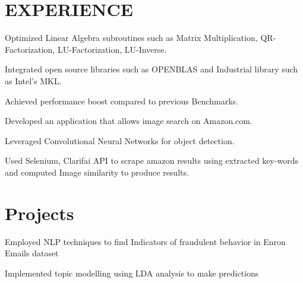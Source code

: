 \documentclass[]{deedy-resume-openfont}
\begin{document}
\begin{minipage}[t]{0.66\textwidth} 


\section{EXPERIENCE}

\vspace{\topsep} %
\begin{tightemize}\item Optimized Linear Algebra subroutines such as Matrix Multiplication, QR-Factorization,
LU-Factorization, LU-Inverse.
\item  Integrated open source libraries such as OPENBLAS and Industrial library such as Intel’s MKL.
\item  Achieved  performance boost compared to previous Benchmarks. 
\end{tightemize}
\sectionsep

\vspace{\topsep} %
\begin{tightemize}\item Developed an application that allows image search on Amazon.com.
\item Leveraged Convolutional Neural Networks for object detection.
\item  Used Selenium, Clarifai API to scrape amazon results using extracted key-words and computed Image similarity to produce results.
\end{tightemize}
\sectionsep


\section{Projects}


\begin{tightemize}
\item Employed NLP techniques to find Indicators of fraudulent behavior in Enron Emails dataset \item Implemented topic modelling using LDA analysis to make predictions\end{tightemize}
\sectionsep


\end{minipage}
\end{document}
